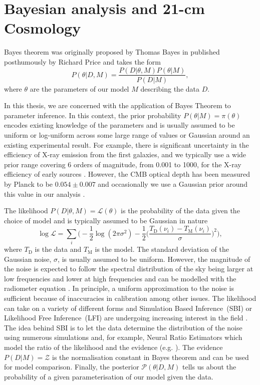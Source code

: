 \section{Bayesian analysis and 21-cm Cosmology}
\label{sec:bayesian_inference_intro}

Bayes theorem was originally proposed by Thomas Bayes in \cite{Bayes_1763} published posthumously by Richard Price and takes the form
\begin{equation}
    P(\theta|D, M) = \frac{P(D|\theta, M)P(\theta|M)}{P(D|M)},
    \label{eq:bayes_intro}
\end{equation}
where $\theta$ are the parameters of our model $M$ describing the data $D$.

In this thesis, we are concerned with the application of Bayes Theorem to parameter inference. In this context, the prior probability $P(\theta|M) = \pi(\theta)$ encodes existing knowledge of the parameters and is usually assumed to be uniform or log-uniform across some large range of values or Gaussian around an existing experimental result. For example, there is significant uncertainty in the efficiency of X-ray emission from the first galaxies, and we typically use a wide prior range covering 6 orders of magnitude, from 0.001 to 1000, for the X-ray efficiency of early sources \cite{Cohen2020}. However, the CMB optical depth has been measured by Planck to be $0.054 \pm 0.007$ and occasionally we use a Gaussian prior around this value in our analysis \cite{Planck2018}.

The likelihood $P(D|\theta, M) = \mathcal{L}(\theta)$ is the probability of the data given the choice of model and is typically assumed to be Gaussian in nature
\begin{equation}
    \log\mathcal{L} = \sum_i \bigg(-\frac{1}{2}\log(2\pi\sigma^2) -\frac{1}{2}\bigg(\frac{T_\mathrm{D}(\nu_i) - T_\mathrm{M}(\nu_i)}{\sigma}\bigg)^2\bigg),
    \label{eq:log_likelihood}
\end{equation}
where $T_\mathrm{D}$ is the data and $T_\mathrm{M}$ is the model. The standard deviation of the Gaussian noise, $\sigma$, is usually assumed to be uniform. However, the magnitude of the noise is expected to follow the spectral distribution of the sky being larger at low frequencies and lower at high frequencies and can be modelled with the radiometer equation \cite{Scheutwinkel2022a}. In principle, a uniform approximation to the noise is sufficient because of inaccuracies in calibration among other issues. The likelihood can take on a variety of different forms \cite{Scheutwinkel2022a} and Simulation Based Inference~(SBI) or Likelihood Free Inference~(LFI) are undergoing increasing interest in the field \cite{Saxena_LFI_21cm_2023}. The idea behind SBI is to let the data determine the distribution of the noise using numerous simulations and, for example, Neural Ratio Estimators which model the ratio of the likelihood and the evidence (e.g. \cite{Miller_tmnre_2021}). The evidence $P(D|M) = \mathcal{Z}$ is the normalisation constant in Bayes theorem and can be used for model comparison. Finally, the posterior $\mathcal{P}(\theta|D, M)$ tells us about the probability of a given parameterisation of our model given the data.

